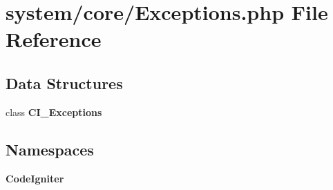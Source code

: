 \section{system/core/\-Exceptions.php File Reference}
\label{_exceptions_8php}
\subsection*{Data Structures}
\begin{DoxyCompactItemize}
\item 
class {\bf C\-I\-\_\-\-Exceptions}
\end{DoxyCompactItemize}
\subsection*{Namespaces}
\begin{DoxyCompactItemize}
\item 
{\bf Code\-Igniter}
\end{DoxyCompactItemize}
